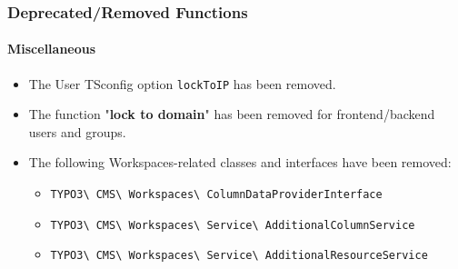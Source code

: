 %

\begin{frame}[fragile]
	\frametitle{Deprecated/Removed Functions}
	\framesubtitle{Miscellaneous}

	\begin{itemize}
		\item The User TSconfig option \texttt{lockToIP} has been removed.
		\item The function "\textbf{lock to domain}" has been removed for frontend/backend
			users and groups.
		\item The following Workspaces-related classes and interfaces have been removed:
			\begin{itemize}\smaller
				\item \texttt{TYPO3\textbackslash
					CMS\textbackslash
					Workspaces\textbackslash
					ColumnDataProviderInterface}
				\item \texttt{TYPO3\textbackslash
					CMS\textbackslash
					Workspaces\textbackslash
					Service\textbackslash
					AdditionalColumnService}
				\item \texttt{TYPO3\textbackslash
					CMS\textbackslash
					Workspaces\textbackslash
					Service\textbackslash
					AdditionalResourceService}
			\end{itemize}\normalsize

	\end{itemize}

\end{frame}

